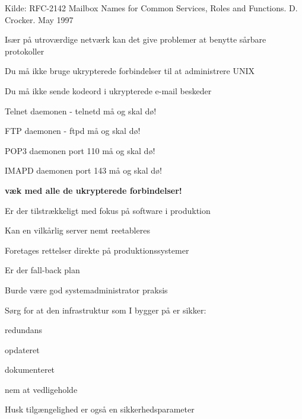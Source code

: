 \documentclass[Screen16to9,17pt]{foils}
\begin{document}
Kilde:
RFC-2142 Mailbox Names for Common Services, Roles and Functions. D.
Crocker. May 1997



\begin{list1}
\item Især på utroværdige netværk kan det give problemer at benytte
  sårbare protokoller
\end{list1}


\begin{list1}
\item Du må ikke bruge ukrypterede forbindelser til at administrere
  UNIX
\item Du må ikke sende kodeord i ukrypterede e-mail beskeder
\end{list1}

\centerline{\hlkbig Telnet daemonen - telnetd må og skal dø!}

\pause
\centerline{\hlkbig FTP daemonen - ftpd må og skal dø!}

\pause
\centerline{\hlkbig POP3 daemonen port 110 må og skal dø!}

\pause
\centerline{\hlkbig IMAPD daemonen port 143 må og skal dø!}

\pause
\vskip 1cm
\centerline{\hlkbig\bf væk med alle de ukrypterede forbindelser!}



\begin{list1}
\item Er der tilstrækkeligt med fokus på software i produktion
\item Kan en vilkårlig server nemt reetableres
\item Foretages rettelser direkte på produktionssystemer
\item Er der fall-back plan
\item Burde være god systemadministrator praksis
\end{list1}




\begin{list1}
\item Sørg for at den infrastruktur som I bygger på er sikker:
\begin{list2}
 \item redundans
       \item opdateret
        \item dokumenteret
        \item nem at vedligeholde
\end{list2}

\item  Husk tilgængelighed er også en sikkerhedsparameter
\end{list1}
\end{document}
